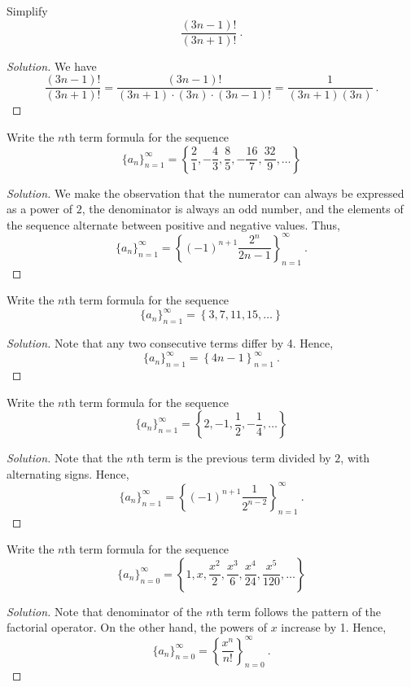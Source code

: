 \documentclass[compacto,10pt,comentarios]{aleph-notas}
\begin{document}
\begin{ejer}
    Simplify
    $$
        \frac{(3n-1)!}{(3n+1)!} ~ .
    $$
\end{ejer}
\begin{proof}[Solution]
    We have
    $$
        \frac{(3n-1)!}{(3n+1)!} = \frac{(3n-1)!}{(3n+1) \cdot (3n) \cdot (3n-1)!} = \frac{1}{(3n + 1)(3n)} ~ .
    $$
\end{proof}

\begin{ejer}
    Write the $n$th term formula for the sequence
    $$
        \{a_n\}_{n=1}^{\infty} = \left\{ \frac{2}{1}, -\frac{4}{3}, \frac{8}{5}, -\frac{16}{7}, \frac{32}{9}, \ldots \right\}
    $$
\end{ejer}
\begin{proof}[Solution]
    We make the observation that the numerator can always be expressed as a power of $2$, the denominator is always an odd number, and the elements of the sequence alternate between positive and negative values. Thus,
    $$
        \{a_n\}_{n=1}^{\infty} = \left\{ \left(-1\right)^{n+1} \frac{2^{n}}{2n-1} \right\}_{n=1}^{\infty} ~ .
    $$
\end{proof}

\begin{ejer}
    Write the $n$th term formula for the sequence
    $$
        \{a_n\}_{n=1}^{\infty} = \left\{ 3, 7, 11, 15, \ldots \right\}
    $$
\end{ejer}
\begin{proof}[Solution]
    Note that any two consecutive terms differ by 4. Hence,
    $$
        \{a_n\}_{n=1}^{\infty} = \left\{ 4n-1 \right\}_{n=1}^{\infty} ~ .
    $$
\end{proof}

\begin{ejer}
    Write the $n$th term formula for the sequence
    $$
        \{a_n\}_{n=1}^{\infty} = \left\{ 2, -1, \frac{1}{2}, -\frac{1}{4}, \ldots \right\}
    $$
\end{ejer}
\begin{proof}[Solution]
    Note that the $n$th term is the previous term divided by $2$, with alternating signs. Hence,
    $$
        \{a_n\}_{n=1}^{\infty} = \left\{ (-1)^{n+1} \frac{1}{2^{n-2}} \right\}_{n=1}^{\infty} ~ .
    $$
\end{proof}

\begin{ejer}
    Write the $n$th term formula for the sequence
    $$
        \{a_n\}_{n=0}^{\infty} = \left\{ 1, x, \frac{x^{2}}{2}, \frac{x^{3}}{6}, \frac{x^{4}}{24}, \frac{x^{5}}{120}, \ldots \right\}
    $$
\end{ejer}
\begin{proof}[Solution]
    Note that denominator of the $n$th term follows the pattern of the factorial operator. On the other hand, the powers of $x$ increase by 1. Hence,
    $$
        \{a_n\}_{n=0}^{\infty} = \left\{ \frac{x^{n}}{n!} \right\}_{n=0}^{\infty} ~ .
    $$
\end{proof}
\end{document}
